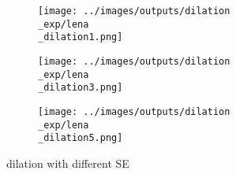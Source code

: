\begin{subfigure}{0.9\textwidth}
   \centering
\begin{subfigure}[t]{0.22\textwidth}
    \texttt{[image: ../images/outputs/dilation\\\_exp/lena\\\_dilation1.png]}
    
    \centering
  \end{subfigure}
\begin{subfigure}[t]{0.22\textwidth}
    \texttt{[image: ../images/outputs/dilation\\\_exp/lena\\\_dilation3.png]}
    
    \centering
  \end{subfigure}
\begin{subfigure}[t]{0.22\textwidth}
    \texttt{[image: ../images/outputs/dilation\\\_exp/lena\\\_dilation5.png]}
    
    \centering
  \end{subfigure}
 \caption{dilation with different SE}
 \end{subfigure}

